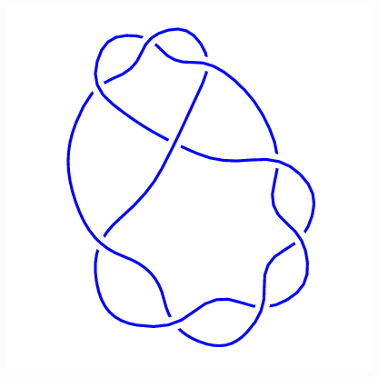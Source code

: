 \begin{figure}[H]
\begin{minipage}[b]{.18\linewidth}
	\end{minipage}
	\begin{minipage}[b]{.18\linewidth}
		\centering
		\includegraphics[width=\linewidth]{../data/9_5.png}
	\end{minipage}
\end{figure}
